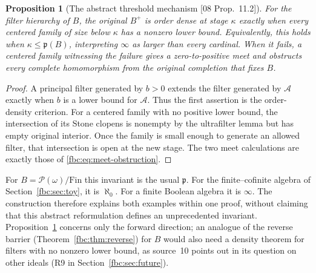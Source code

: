 \documentclass[11pt,letterpaper]{article}
\newtheorem{proposition}[theorem]{Proposition}
\theoremstyle{definition}
\theoremstyle{remark}
\newcommand{\om}{\omega}
\newcommand{\Fin}{\mathrm{Fin}}
\newcommand{\pow}{\mathcal P}
\newcommand{\cp}{\mathfrak p}
\newcommand{\src}[1]{\textup{[#1]}}
\begin{document}
\begin{proposition}[The abstract threshold mechanism \src{08 Prop.~11.2}]
\label{fbc:prop:general-p}
For the filter hierarchy of $B$, the original $B^+$ is order dense
at stage $\kappa$ exactly when every centered family of size
below $\kappa$ has a nonzero lower bound. Equivalently, this holds
when $\kappa\leq\mathfrak p(B)$, interpreting $\infty$ as larger
than every cardinal. When it fails, a centered family witnessing
the failure gives a zero-to-positive meet and obstructs every
complete homomorphism from the original completion that fixes $B$.
\end{proposition}
\begin{proof}
A principal filter generated by $b>0$ extends the filter generated
by $\mathcal A$ exactly when $b$ is a lower bound for
$\mathcal A$. Thus the first assertion is the order-density
criterion. For a centered family with no positive lower bound,
the intersection of its Stone clopens is nonempty by the
ultrafilter lemma but has empty original interior. Once the
family is small enough to generate an allowed filter, that
intersection is open at the new stage. The two meet calculations
are exactly those of \eqref{fbc:eq:meet-obstruction}.
\end{proof}

For $B=\pow(\om)/\Fin$ this invariant is the usual $\cp$.
For the finite--cofinite algebra of Section~\ref{fbc:sec:toy}, it is
$\aleph_0$. For a finite Boolean algebra it is $\infty$. The
construction therefore explains both examples within one proof,
without claiming that this abstract reformulation defines an
unprecedented invariant. Proposition~\ref{fbc:prop:general-p} concerns
only the forward direction; an analogue of the reverse barrier
(Theorem~\ref{fbc:thm:reverse}) for $B$ would also need a density theorem
for filters with no nonzero lower bound, as source~10 points out in its
question on other ideals (R9 in Section~\ref{fbc:sec:future}).
\end{document}
